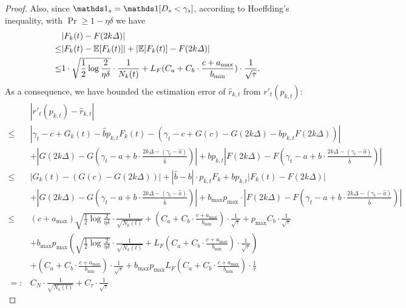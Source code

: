 \begin{proof}
    Also, since $\ind_s=\ind[D_s<\gamma_s]$, according to Hoeffding's inequality, with $\Pr\geq1-\eta\delta$ we have
    \begin{equation}
        \label{eq:hoeffding_f_k}
        \begin{aligned}
            &|F_k(t)-F(2k\Delta)|\\
            \leq&|F_k(t)-\mathbb{E}[F_k(t)]| + |\mathbb{E}[F_k(t)] - F(2k\Delta)|\\
            \leq&1\cdot\sqrt{\frac12\log\frac2{\eta\delta}}\cdot\frac1{N_k(t)} + L_F(C_a + C_b\cdot\frac{c+a_{\max}}{b_{\min}})\cdot\frac1{\sqrt{\tau}}.
        \end{aligned}
    \end{equation}
    As a consequence, we have bounded the estimation error of $\hat r_{k,t}$ from $r'_t(p_{k,t})$:
    \begin{equation}
        \label{eq:r_derivatives_estimation_error_final}
        \begin{aligned}
            &|r'_t(p_{k,t})-\hat r_{k,t}|\\
            \leq&|\gamma_t - c + G_k(t)-\hat b p_{k,t} F_k(t) - (\gamma_t-c+G(c)-G(2k\Delta)-b p_{k,t} F(2k\Delta))|\\
            &+ |G(2k\Delta) - G(\gamma_t-a+b\cdot\frac{2k\Delta-(\gamma_t-\hat a)}{\hat b})|+ bp_{k,t}|F(2k\Delta) - F(\gamma_t-a+b\cdot\frac{2k\Delta-(\gamma_t-\hat a)}{\hat b})|\\
            \leq&|G_k(t)-(G(c)-G(2k\Delta))| + |\hat b - b|\cdot p_{k,t}F_k + bp_{k,t}|F_k(t)-F(2k\Delta)|\\
            &+ |G(2k\Delta)-G(\gamma_t-a+b\cdot\frac{2k\Delta-(\gamma_t-\hat a)}{\hat b})| + b_{\max}p_{\max}\cdot|F(2k\Delta)-F(\gamma_t-a+b\cdot\frac{2k\Delta - (\gamma_t-\hat a)}{\hat b})|\\
            \leq&(c+a_{\max})\sqrt{\frac12\log\frac2{\eta\delta}}\cdot\frac1{\sqrt{N_k(t)}} + (C_a + C_b\cdot\frac{c+a_{\max}}{b_{\min}})\cdot\frac1{\sqrt{\tau}} + p_{\max}C_b\cdot\frac1{\sqrt{\tau}}\\
            &+ b_{\max}p_{\max}(\sqrt{\frac12\log\frac2{\eta\delta}}\cdot\frac1{\sqrt{N_k(t)}} + L_F(C_a + C_b\cdot\frac{c+a_{\max}}{b_{\min}})\cdot\frac1{\sqrt{\tau}})\\
            &+ (C_a + C_b\cdot\frac{c+a_{\max}}{b_{\min}})\cdot\frac1{\sqrt{\tau}} + b_{\max}p_{\max}L_F(C_a + C_b\cdot\frac{c+a_{\max}}{b_{\min}})\cdot\frac1{\tau}\\
            =:&C_N\cdot\frac1{\sqrt{N_k(t)}} + C_{\tau}\cdot\frac1{\sqrt{\tau}}

\end{aligned}
\end{equation}
\end{proof}
